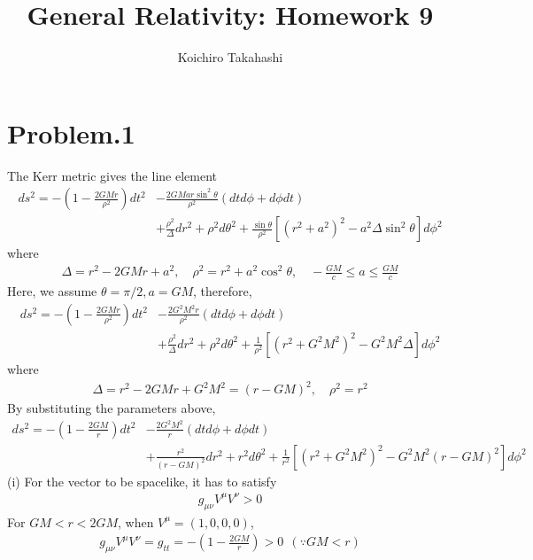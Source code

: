\documentclass[12pt]{article}
\begin{document}
\title{General Relativity: Homework 9}
\author{Koichiro Takahashi}
\maketitle

\section*{Problem.1}
The Kerr metric gives the line element
\begin{align}
ds^2 = - \left(1 - \frac{2 G M r}{\rho^2} \right) dt^2 & - \frac{2 G M a r \sin^2{\theta}}{\rho^2} \left(dt d\phi + d\phi dt\right) \nonumber \\
&+ \frac{\rho^2}{\Delta} dr^2 + \rho^2 d\theta^2 + \frac{\sin{\theta}}{\rho^2} \left[ \left(r^2 + a^2\right)^2 - a^2 \Delta \sin^2{\theta} \right] d\phi^2
\end{align}
where
\begin{align}
\Delta = r^2 - 2 G M r + a^2, \quad \rho^2 = r^2 + a^2 \cos^2{\theta}, \quad - \frac{G M}{c} \leq a \leq \frac{G M}{c}
\end{align}
Here, we assume $\theta = \pi/2, a = G M$, therefore,
\begin{align}
ds^2 = - \left(1 - \frac{2 G M r}{\rho^2} \right) dt^2 & - \frac{2 G^2 M^2 r}{\rho^2} \left(dt d\phi + d\phi dt\right) \nonumber \\
&+ \frac{\rho^2}{\Delta} dr^2 + \rho^2 d\theta^2 + \frac{1}{\rho^2} \left[ \left(r^2 + G^2M^2\right)^2 - G^2M^2 \Delta \right] d\phi^2
\end{align}
where
\begin{align}
\Delta = r^2 - 2 G M r + G^2 M^2 = \left(r - GM\right)^2, \quad \rho^2 = r^2
\end{align}
By substituting the parameters above,
\begin{align}
ds^2 = - \left(1 - \frac{2 G M}{r} \right) dt^2 & - \frac{2 G^2 M^2}{r} \left(dt d\phi + d\phi dt\right) \nonumber \\
&+ \frac{r^2}{\left(r - GM\right)^2} dr^2 + r^2 d\theta^2 + \frac{1}{r^2} \left[ \left(r^2 + G^2M^2\right)^2 - G^2M^2 \left(r - GM\right)^2 \right] d\phi^2
\end{align}
(i) For the vector to be spacelike, it has to satisfy
\begin{align}
g_{\mu \nu} V^{\mu} V^{\nu} > 0
\end{align}
For $GM < r < 2GM$, when $V^{\mu} = \left(1, 0, 0, 0\right)$,
\begin{align}
g_{\mu \nu} V^{\mu} V^{\nu} = g_{tt} = - \left(1 - \frac{2 G M}{r} \right) > 0 ~~\left(\because GM < r\right)
\end{align}
\end{document}
